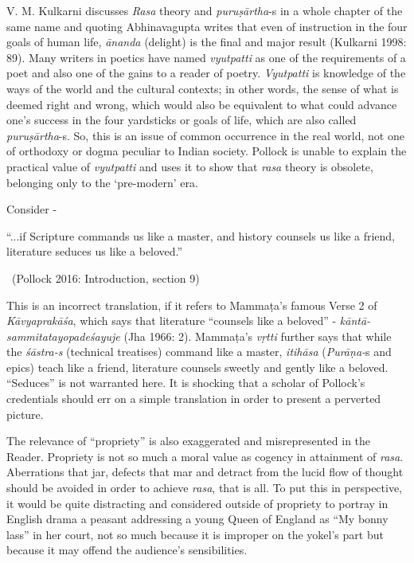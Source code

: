 V. M. Kulkarni discusses \textit{Rasa} theory and \textit{puruṣārtha}-s in a whole chapter of the same name and quoting Abhinavagupta writes that even of instruction in the four goals of human life, \textit{ānanda} (delight) is the final and major result (Kulkarni 1998: 89). Many writers in poetics have named \textit{vyutpatti} as one of the requirements of a poet and also one of the gains to a reader of poetry. \textit{Vyutpatti} is knowledge of the ways of the world and the cultural contexts; in other words, the sense of what is deemed right and wrong, which would also be equivalent to what could advance one’s success in the four yardsticks or goals of life, which are also called \textit{puruṣārtha}-s. So, this is an issue of common occurrence in the real world, not one of orthodoxy or dogma peculiar to Indian society. Pollock is unable to explain the practical value of \textit{vyutpatti }and uses it to show that \textit{rasa} theory is obsolete, belonging only to the ‘pre-modern’ era.

\eject

Consider -
\begin{myquote}
“...if Scripture commands us like a master, and history counsels us like a friend, literature seduces us like a beloved.” 

~\hfill (Pollock 2016: Introduction, section 9)
\end{myquote}

This is an incorrect translation, if it refers to Mammaṭa’s famous Verse 2 of \textit{Kāvyaprakāśa}, which says that literature “counsels like a beloved” -\textit{ kāntā-sammitatayopadeśayuje }(Jha 1966: 2). Mammaṭa’s \textit{vṛtti} further says that while the \textit{śāstra-s }(technical treatises) command like a master, \textit{itihāsa} (\textit{Purāṇa-}s and epics) teach like a friend, literature counsels sweetly and gently like a beloved. “Seduces” is not warranted here. It is shocking that a scholar of Pollock’s credentials should err on a simple translation in order to present a perverted picture.

The relevance of “propriety” is also exaggerated and misrepresented in the Reader. Propriety is not so much a moral value as cogency in attainment of \textit{rasa}. Aberrations that jar, defects that mar and detract from the lucid flow of thought should be avoided in order to achieve \textit{rasa}, that is all. To put this in perspective, it would be quite distracting and considered outside of propriety to portray in English drama a peasant addressing a young Queen of England as “My bonny lass” in her court, not so much because it is improper on the yokel’s part but because it may offend the audience’s sensibilities.

